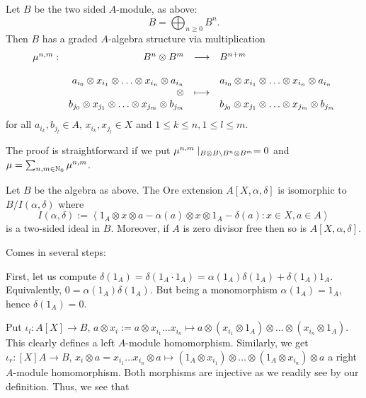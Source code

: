 \begin{prop}\label{prop02}
Let $B$ be the two sided $A$-module, as above:%
$$B = \bigoplus_{n \geq 0} B^n.$$
Then $B$ has a graded $A$-algebra structure via multiplication
$$\bao{rrcl}
\mu^{n,m} :& B^n \otimes B^m &\longrightarrow& B^{n+m}\\
&&&\\
&a_{i_0} \otimes x_{i_1} \otimes \ldots \otimes  x_{i_n} \otimes a_{i_{n}} & & a_{i_0} \otimes x_{i_1} \otimes \ldots \otimes  x_{i_n} \otimes a_{i_{n}}\\
&\otimes &\longmapsto&\\
& b_{j_0} \otimes x_{j_1} \otimes \ldots \otimes  x_{j_m} \otimes b_{j_{m}} & &  b_{j_0} \otimes x_{j_1} \otimes \ldots \otimes  x_{j_m} \otimes b_{j_{m}}\\
\ea$$
for all $a_{i_k}, b_{j_l} \in A$, $x_{i_k}, x_{j_l} \in X$ and $1 \leq k \leq n, 1 \leq l \leq m$.
\end{prop}
\bws The proof is straightforward if we put $\mu^{n,m}\mid_{B \otimes B \bsl B^n \otimes B^m} = 0$ and $\mu = \sum_{n,m \in \nz_0} \mu^{n,m}$.
\begin{prop}\label{prop03}
Let $B$ be the algebra as above. The Ore extension $A[X,\alpha,\delta]$ is isomorphic to
$B/I(\alpha,\delta)$ where
$$I(\alpha,\delta) := \left<1_A \otimes x \otimes a - \alpha(a) \otimes x \otimes 1_A - \delta(a): x \in X, a \in A\right>$$
is a two-sided ideal in $B$. Moreover, if $A$ is zero divisor free then so is $A[X,\alpha,\delta]$.
\end{prop}
\bws Comes in several steps:
\bn
\item First, let us compute $\delta(1_A) = \delta(1_A \cdot 1_A) = \alpha(1_A) \delta(1_A) + \delta(1_A) 1_A$. Equivalently, $0 = \alpha(1_A) \delta(1_A)$. But being a monomorphism $\alpha(1_A) = 1_A$, hence $\delta(1_A) = 0$.
\item Put $\iota_l : A[X] \longrightarrow B$, $a \otimes x_i := a \otimes x_{i_1} \ldots x_{i_n}  \longmapsto a \otimes (x_{i_1} \otimes 1_A) \otimes \ldots \otimes (x_{i_n} \otimes 1_A)$. This clearly defines a left $A$-module homomorphism. Similarly, we get $\iota_r : [X]A \longrightarrow B$, $x_i \otimes a = x_{i_1} \ldots x_{i_n} \otimes a \longmapsto (1_A \otimes x_{i_1}) \otimes \ldots \otimes (1_A \otimes x_{i_n}) \otimes a$ a right $A$-module homomorphism. Both morphisms are injective as we readily see by our definition. Thus, we see that
